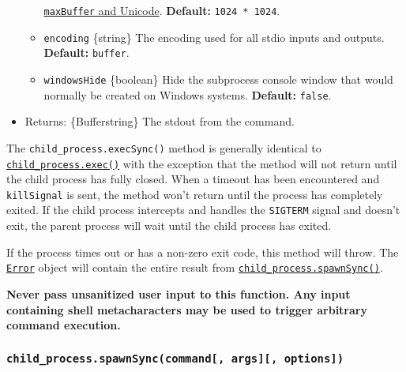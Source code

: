\begin{itemize}
\begin{itemize}
    \hyperref[maxbuffer-and-unicode]{\texttt{maxBuffer} and Unicode}.
    \textbf{Default:} \texttt{1024\ *\ 1024}.
  \item
    \texttt{encoding} \{string\} The encoding used for all stdio inputs
    and outputs. \textbf{Default:}
    \texttt{\textquotesingle{}buffer\textquotesingle{}}.
  \item
    \texttt{windowsHide} \{boolean\} Hide the subprocess console window
    that would normally be created on Windows systems. \textbf{Default:}
    \texttt{false}.
  \end{itemize}
\item
  Returns: \{Buffer\textbar string\} The stdout from the command.
\end{itemize}

The \texttt{child\_process.execSync()} method is generally identical to
\hyperref[child_processexeccommand-options-callback]{\texttt{child\_process.exec()}}
with the exception that the method will not return until the child
process has fully closed. When a timeout has been encountered and
\texttt{killSignal} is sent, the method won't return until the process
has completely exited. If the child process intercepts and handles the
\texttt{SIGTERM} signal and doesn't exit, the parent process will wait
until the child process has exited.

If the process times out or has a non-zero exit code, this method will
throw. The \href{errors.md\#class-error}{\texttt{Error}} object will
contain the entire result from
\hyperref[child_processspawnsynccommand-args-options]{\texttt{child\_process.spawnSync()}}.

\textbf{Never pass unsanitized user input to this function. Any input
containing shell metacharacters may be used to trigger arbitrary command
execution.}

\subsubsection{\texorpdfstring{\texttt{child\_process.spawnSync(command{[},\ args{]}{[},\ options{]})}}{child\_process.spawnSync(command{[}, args{]}{[}, options{]})}}\label{child_process.spawnsynccommand-args-options}

